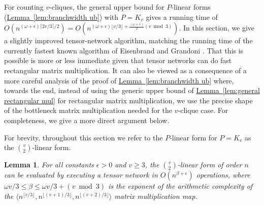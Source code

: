 \documentclass[11pt]{article}
\numberwithin{equation}{section}
\newtheorem{lemma}[theorem]{Lemma}
\theoremstyle{definition}
\theoremstyle{plain}
\newcommand{\expref}[2]{\hyperref[#2]{#1~\ref{#2}}}
\newcommand{\bra}{\ensuremath{\langle}}
\newcommand{\ket}{\ensuremath{\rangle}}
\begin{document}
For counting $v$-cliques, the general upper bound for $P$-linear forms
(\expref{Lemma}{lem:branchwidth ub}) with $P=K_v$ gives a running time of
$O(n^{(\omega+\epsilon)\lceil 2v/3 \rceil /2}) = O(n^{(\omega +
  \epsilon)\lfloor v/3 \rfloor + \tfrac{(\omega+\epsilon)}{2}(v \bmod
  3)})$.  In this section, we give a slightly improved tensor-network
algorithm, matching the running time of the currently fastest known algorithm
of Eisenbrand and Grandoni \cite{EisenbrandG2004}.  That this is possible
is more or less immediate given that tensor networks can do fast rectangular
matrix multiplication.  It can also be viewed as a consequence of a more
careful analysis of the proof of \expref{Lemma}{lem:branchwidth ub} where,
towards the end, instead of using the generic upper bound of
\expref{Lemma}{lem:general rectangular mul} for rectangular matrix
multiplication, we use the precise shape of the bottleneck matrix
multiplication needed for the $v$-clique case. For completeness,
we give a more direct argument below.

For brevity, throughout this section we refer to the $P$-linear form
for $P=K_v$ as the $\binom{v}{2}$-linear form.
\begin{lemma}
  \label{lem:v choose 2 linear form upper bound}
For all constants $\epsilon>0$ and $v \geq 3$, the $\binom{v}{2}$-linear form of order $n$
can be evaluated by executing a tensor network in
$O(n^{\beta+\epsilon})$ operations, where $\omega v/3 \le \beta \le \omega v/3 + (v \bmod 3)$ is the exponent of the arithmetic complexity of the $\bra n^{\lfloor v/3 \rfloor}, n^{\lfloor (v+1)/3 \rfloor}, n^{\lfloor (v+2)/3 \rfloor} \ket$ matrix multiplication map.
\end{lemma}
\end{document}
